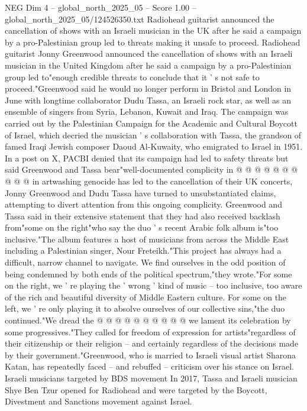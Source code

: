 \begin{textsample}{NEG Dim 4 – global\_north\_2025\_05 – Score 1.00 – global\_north\_2025\_05/124526350.txt}  \label{ex:f4_neg_265}
Radiohead guitarist announced the cancellation of shows with an Israeli musician in the UK after he said a campaign by a pro-Palestinian group led to threats making it unsafe to proceed.
Radiohead guitarist Jonny Greenwood announced the cancellation of shows with an Israeli musician in the United Kingdom after he said a campaign by a pro-Palestinian group led to"enough credible threats to conclude that it ' s not safe to proceed."Greenwood said he would no longer perform in Bristol and London in June with longtime collaborator Dudu Tassa, an Israeli rock star, as well as an ensemble of singers from Syria, Lebanon, Kuwait and Iraq.
The campaign was carried out by the Palestinian Campaign for the Academic and Cultural Boycott of Israel, which decried the musician ' s collaboration with Tassa, the grandson of famed Iraqi Jewish composer Daoud Al-Kuwaity, who emigrated to Israel in 1951.
In a post on X, PACBI denied that its campaign had led to safety threats but said Greenwood and Tassa bear"well-documented complicity in @ @ @ @ @ @ @ @ @ @ in artwashing genocide has led to the cancellation of their UK concerts, Jonny Greenwood and Dudu Tassa have turned to unsubstantiated claims, attempting to divert attention from this ongoing complicity.
Greenwood and Tassa said in their extensive statement that they had also received backlash from"some on the right"who say the duo ' s recent Arabic folk album is"too inclusive."The album features a host of musicians from across the Middle East including a Palestinian singer, Nour Freteikh."This project has always had a difficult, narrow channel to navigate.
We find ourselves in the odd position of being condemned by both ends of the political spectrum,"they wrote."For some on the right, we ' re playing the ' wrong ' kind of music -- too inclusive, too aware of the rich and beautiful diversity of Middle Eastern culture.
For some on the left, we ' re only playing it to absolve ourselves of our collective sins,"the duo continued."We dread the @ @ @ @ @ @ @ @ @ @ we lament its celebration by some progressives."They called for freedom of expression for artists"regardless of their citizenship or their religion -- and certainly regardless of the decisions made by their government."Greenwood, who is married to Israeli visual artist Sharona Katan, has repeatedly faced -- and rebuffed -- criticism over his stance on Israel.
Israeli musicians targeted by BDS movement In 2017, Tassa and Israeli musician Shye Ben Tzur opened for Radiohead and were targeted by the Boycott, Divestment and Sanctions movement against Israel.

\end{textsample}
